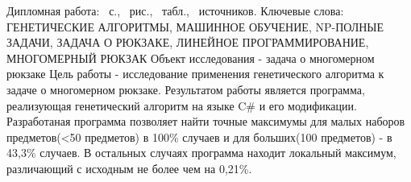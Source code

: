 Дипломная работа: \pageref*{LastPage}~с., \totfig~рис., \tottab~табл., \totref~источников.
Ключевые слова: ГЕНЕТИЧЕСКИЕ АЛГОРИТМЫ, МАШИННОЕ ОБУЧЕНИЕ, NP-ПОЛНЫЕ ЗАДАЧИ, ЗАДАЧА О РЮКЗАКЕ, ЛИНЕЙНОЕ ПРОГРАММИРОВАНИЕ, МНОГОМЕРНЫЙ РЮКЗАК
Объект исследования - задача о многомерном рюкзаке
Цель работы - исследование применения генетического алгоритма к задаче о многомерном рюкзаке.
Результатом работы является программа, реализующая генетический алгоритм на языке C\# и его модификации.
Разработаная программа позволяет найти точные максимумы для малых наборов предметов(<50 предметов) в 100\% случаев и для больших(100 предметов) - в 43,3\% случаев. В остальных случаях программа находит локальный максимум, различающий с исходным не более чем на 0,21\%.